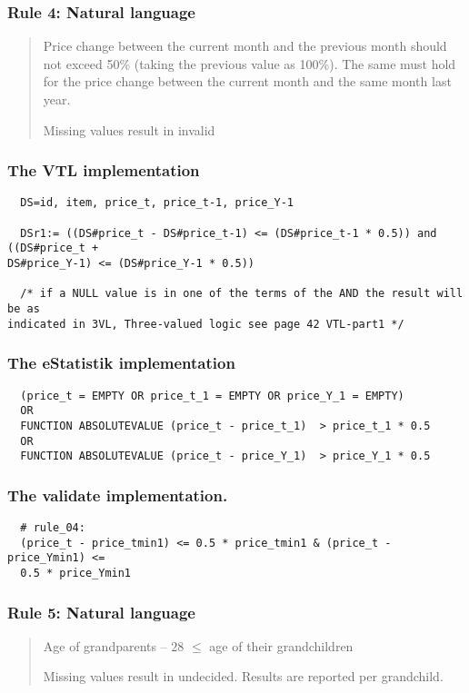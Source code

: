 \newpage

\subsubsection*{  Rule 4: Natural language}
\begin{quote}


Price change between the current month and the previous month should not exceed 50\% (taking the previous value as 100\%). The same must hold for the price change between the current month and the same month last year.

Missing values result in invalid



\end{quote}
\subsubsection*{The VTL implementation}
\begin{verbatim}
  DS=id, item, price_t, price_t-1, price_Y-1

  DSr1:= ((DS#price_t - DS#price_t-1) <= (DS#price_t-1 * 0.5)) and ((DS#price_t +
DS#price_Y-1) <= (DS#price_Y-1 * 0.5))

  /* if a NULL value is in one of the terms of the AND the result will be as
indicated in 3VL, Three-valued logic see page 42 VTL-part1 */
\end{verbatim}
\subsubsection*{The eStatistik implementation}
\begin{verbatim}
  (price_t = EMPTY OR price_t_1 = EMPTY OR price_Y_1 = EMPTY)
  OR
  FUNCTION ABSOLUTEVALUE (price_t - price_t_1)  > price_t_1 * 0.5
  OR
  FUNCTION ABSOLUTEVALUE (price_t - price_Y_1)  > price_Y_1 * 0.5\end{verbatim}
\subsubsection*{The validate implementation.}
\begin{verbatim}
  # rule_04:
  (price_t - price_tmin1) <= 0.5 * price_tmin1 & (price_t - price_Ymin1) <=
  0.5 * price_Ymin1
\end{verbatim}


\newpage

\subsubsection*{  Rule 5: Natural language}
\begin{quote}


Age of grandparents $–$ $28$ $\leq$ age of their grandchildren

Missing values result in undecided. Results are reported per grandchild.



\end{quote}
